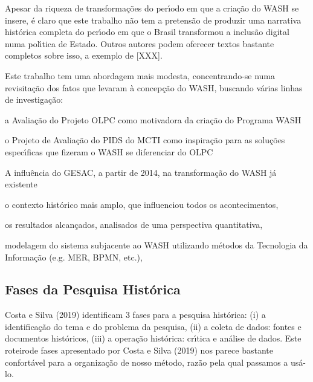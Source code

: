 \documentclass[
12pt,		%
openright,	%
twoside,  %
a4paper,			%
chapter=TITLE,		%
english,			%
french,				%
spanish,			%
brazil				%
]{USPSC-classe/USPSC}
\begin{document}
Apesar da riqueza de transforma\c{c}\~oes do per\'{\i}odo em que a cria\c{c}\~ao do WASH se insere, \'e claro que este trabalho n\~ao tem a pretens\~ao de produzir uma narrativa hist\'orica completa do per\'{\i}odo em que o Brasil transformou a inclus\~ao digital numa pol\'{\i}tica de Estado. Outros autores podem oferecer textos bastante completos sobre isso, a exemplo de [XXX].




Este trabalho tem uma abordagem mais modesta, concentrando-se numa revisita\c{c}\~ao dos fatos que levaram \`a concep\c{c}\~ao do WASH, buscando v\'arias linhas de investiga\c{c}\~ao:





\begin{alineas}
\item a Avalia\c{c}\~ao do Projeto OLPC como motivadora da cria\c{c}\~ao do Programa WASH
\item o Projeto de Avalia\c{c}\~ao do PIDS do MCTI como inspira\c{c}\~ao para as solu\c{c}\~oes espec\'{\i}ficas que fizeram o WASH se diferenciar do OLPC
\item A influ\^encia do GESAC, a partir de 2014, na transforma\c{c}\~ao do WASH j\'a existente
\item o contexto hist\'orico mais amplo, que influenciou todos os acontecimentos,
\item os resultados alcan\c{c}ados, analisados de uma perspectiva quantitativa,
\item modelagem do sistema subjacente ao WASH utilizando m\'etodos da Tecnologia da Informa\c{c}\~ao (e.g. MER, BPMN, etc.),
\end{alineas}

\subsection[Fases da Pesquisa Hist\'orica]{Fases da Pesquisa Hist\'orica}\label{Fases da Pesquisa Hist\'orica}
 Costa e Silva (2019) identificam 3 fases para a pesquisa hist\'orica: (i) a identifica\c{c}\~ao do tema e do problema da pesquisa, (ii) a coleta de dados: fontes e documentos hist\'oricos, (iii) a opera\c{c}\~ao hist\'orica: cr\'{\i}tica e an\'alise de dados. Este \textquotedbl roteiro\textquotedbl  de fases apresentado por  Costa e Silva (2019) nos parece bastante confort\'avel para a organiza\c{c}\~ao de nosso m\'etodo, raz\~ao pela qual passamos a us\'a-lo.
\end{document}
